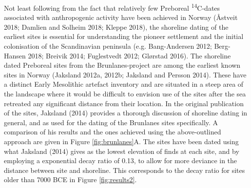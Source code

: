 \documentclass[
]{article}
\begin{document}
Not least following from the fact that relatively few Preboreal \textsuperscript{14}C-dates associated with anthropogenic activity have been achieved in Norway (Åstveit 2018; Damlien and Solheim 2018; Kleppe 2018), the shoreline dating of the earliest sites is essential for understanding the pioneer settlement and the initial colonisation of the Scandinavian peninsula (e.g. Bang-Andersen 2012; Berg-Hansen 2018; Breivik 2014; Fuglestvedt 2012; Glørstad 2016). The shoreline dated Preboreal sites from the Brunlanes-project are among the earliest known sites in Norway (Jaksland 2012a, 2012b; Jaksland and Persson 2014). These have a distinct Early Mesolithic artefact inventory and are situated in a steep area of the landscape where it would be difficult to envision use of the sites after the sea retreated any significant distance from their location. In the original publication of the sites, Jaksland (2014) provides a thorough discussion of shoreline dating in general, and as used for the dating of the Brunlanes sites specifically. A comparison of his results and the ones achieved using the above-outlined approach are given in Figure \ref{fig:brunlanes}A. The sites have been dated using what Jaksland (2014) gives as the lowest elevation of finds at each site, and by employing a exponential decay ratio of 0.13, to allow for more deviance in the distance between site and shoreline. This corresponds to the decay ratio for sites older than 7000 BCE in Figure \ref{fig:results2}.
\end{document}
